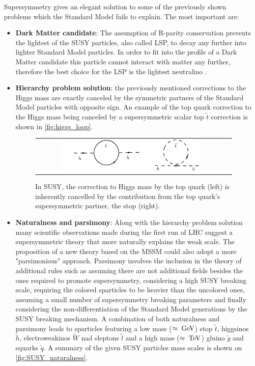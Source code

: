 \FloatBarrier

Supersymmetry gives an elegant solution to some of the  previously shown problems which the Standard Model fails to explain. The most important are: 

\begin{itemize}
	\item \textbf{Dark Matter candidate}: The assumption of R-parity conservation prevents the lightest of the SUSY particles, also called LSP, to decay any further into lighter Standard Model particles. In order to fit into the profile of a Dark Matter candidate this particle cannot interact with matter any further, therefore the best choice for the LSP is the lightest neutralino \neutralinoone.  
	
	\item \textbf{Hierarchy problem solution}: the previously mentioned corrections to the Higgs mass are exactly canceled by the symmetric partners of the Standard Model particles with opposite sign. An example of the top quark correction to the Higgs mass being canceled by a supersymmetric scalar top $\widetilde{t}$ correction is shown in \autoref{fig:higgs_loop}.
	
	\begin{figure}[tbh!]
		\centering
		\begin{tabular}{cc}
			\includegraphics[width=0.75\textwidth]{theory/pics/higgs_loop.png}
		\end{tabular}
		\caption{In SUSY, the correction to Higgs mass by the top quark (left) is inherently cancelled by the contribution from the top quark's supersymmetric partner, the stop (right).}
		\label{fig:higgs_loop}
	\end{figure}

	\item \textbf{Naturalness and parsimony}: Along with the hierarchy problem solution many scientific observations made during the first run of LHC suggest a supersymmetric theory that more naturally explains the weak scale\cite{Craig:2013cxa}. The proposition of a new theory based on the MSSM could also adopt a more "parsimonious" approach. Parsimony involves the inclusion in the theory of additional rules such as assuming there are not additional fields besides the ones required to promote supersymmetry, considering a high SUSY breaking scale, requiring the colored sparticles to be heavier than the uncolored ones, assuming a small number of supersymmetry breaking parameters and finally considering the non-differentiation of the Standard Model generations by the SUSY breaking mechanism. A combination of both naturalness and parsimony leads to sparticles featuring a low mass ($\approx\;\text{Ge}\kern-0.06667em\text{V}$) stop $\widetilde{t}$, higgsinos $\widetilde{h}$, electroweakinos $\widetilde{W}$ nad sleptons $\widetilde{l}$ and a high mass ($\approx\;\text{Te}\kern-0.06667em\text{V}$) gluino $\widetilde{g}$ and squarks $\widetilde{q}$. A summary of the given SUSY particles mass scales is shown on \autoref{fig:SUSY_naturalness}.


\end{itemize}
